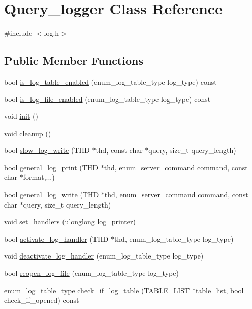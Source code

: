 \hypertarget{classQuery__logger}{}\section{Query\+\_\+logger Class Reference}
\label{classQuery__logger}


{\ttfamily \#include $<$log.\+h$>$}

\subsection*{Public Member Functions}
\begin{DoxyCompactItemize}
\item 
bool \mbox{\hyperlink{classQuery__logger_aeb50a144282abf8f9e7e5a52c11652bb}{is\+\_\+log\+\_\+table\+\_\+enabled}} (enum\+\_\+log\+\_\+table\+\_\+type log\+\_\+type) const
\item 
bool \mbox{\hyperlink{classQuery__logger_a020a7d8f94622d7bb588417892d6a1be}{is\+\_\+log\+\_\+file\+\_\+enabled}} (enum\+\_\+log\+\_\+table\+\_\+type log\+\_\+type) const
\item 
void \mbox{\hyperlink{classQuery__logger_aeedec814a8f8ccdef7f269707013b50e}{init}} ()
\item 
void \mbox{\hyperlink{classQuery__logger_a83604951e8caedf803872ce838305369}{cleanup}} ()
\item 
bool \mbox{\hyperlink{classQuery__logger_a52e6c9bf61b1518100757d14df97e500}{slow\+\_\+log\+\_\+write}} (T\+HD $\ast$thd, const char $\ast$query, size\+\_\+t query\+\_\+length)
\item 
bool \mbox{\hyperlink{classQuery__logger_a82f8c617a555e6263eea00b84149f8c9}{general\+\_\+log\+\_\+print}} (T\+HD $\ast$thd, enum\+\_\+server\+\_\+command command, const char $\ast$format,...)
\item 
bool \mbox{\hyperlink{classQuery__logger_a4d0e99459ac6b1b51b96a028c87f560b}{general\+\_\+log\+\_\+write}} (T\+HD $\ast$thd, enum\+\_\+server\+\_\+command command, const char $\ast$query, size\+\_\+t query\+\_\+length)
\item 
void \mbox{\hyperlink{classQuery__logger_abdae239f31748b1d940e44caadff77d7}{set\+\_\+handlers}} (ulonglong log\+\_\+printer)
\item 
bool \mbox{\hyperlink{classQuery__logger_a5dcb287949aabb21bd0b0f4b6caab8c5}{activate\+\_\+log\+\_\+handler}} (T\+HD $\ast$thd, enum\+\_\+log\+\_\+table\+\_\+type log\+\_\+type)
\item 
void \mbox{\hyperlink{classQuery__logger_a8a25076c9d7c8141776fc952ba126f9d}{deactivate\+\_\+log\+\_\+handler}} (enum\+\_\+log\+\_\+table\+\_\+type log\+\_\+type)
\item 
bool \mbox{\hyperlink{classQuery__logger_a7c11871e7aed4b78ed6201132d68f86e}{reopen\+\_\+log\+\_\+file}} (enum\+\_\+log\+\_\+table\+\_\+type log\+\_\+type)
\item 
enum\+\_\+log\+\_\+table\+\_\+type \mbox{\hyperlink{classQuery__logger_a08eb38503047a4778a376c38c8a227e3}{check\+\_\+if\+\_\+log\+\_\+table}} (\mbox{\hyperlink{structTABLE__LIST}{T\+A\+B\+L\+E\+\_\+\+L\+I\+ST}} $\ast$table\+\_\+list, bool check\+\_\+if\+\_\+opened) const
\end{DoxyCompactItemize}



